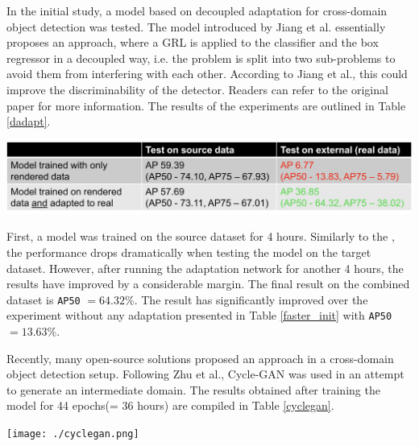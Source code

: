 In the initial study, a model based on decoupled adaptation for cross-domain object detection \cite{Jiang2021} was tested. The model introduced by Jiang et al. essentially proposes an  approach, where a GRL is applied to the classifier and the box regressor in a decoupled way, i.e. the problem is split into two sub-problems to avoid them from interfering with each other. According to Jiang et al., this could improve the discriminability of the detector. Readers can refer to the original paper \cite{Jiang2021} for more information. The results of the experiments are outlined in Table \ref{dadapt}.

\begin{table}[htb]
	\begin{center}
		\includegraphics[width=14cm]{./dadapt.png}
	\end{center}
	\begin{center}
		\label{dadapt}
	\end{center}
\end{table}

First, a model was trained on the source dataset for 4 hours. Similarly to the , the performance drops dramatically when testing the model on the target dataset. However, after running the adaptation network for another 4 hours, the results have improved by a considerable margin. The final result on the combined dataset is \texttt{AP50} $= 64.32\%$. The result has significantly improved over the experiment without any adaptation presented in Table \ref{faster_init} with \texttt{AP50} $= 13.63\%$. 

Recently, many open-source solutions proposed \cite{Inoue_2018_CVPR, Chen2020, Arruda2019} an  approach in a cross-domain object detection setup. Following Zhu et al., Cycle-GAN \cite{Zhu2017} was used in an attempt to generate an intermediate domain. The results obtained after training the model for 44 epochs(= 36 hours) are compiled in Table \ref{cyclegan}.  

\begin{table}[htb]
	\begin{center}
		\texttt{[image: ./cyclegan.png]}
	\end{center}
	\begin{center}
		\label{cyclegan}
	\end{center}
\end{table}

